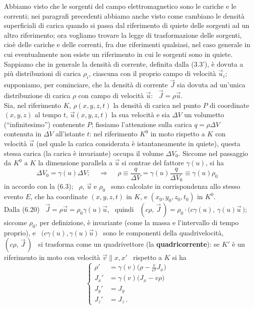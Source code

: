 Abbiamo visto che le sorgenti del campo elettromagnetico sono le cariche e le
correnti; nei paragrafi precedenti abbiamo anche visto come cambiano le
densit\`a superficiali di carica quando si passa dal riferimento di quiete delle
sorgenti ad un altro riferimento; ora vogliamo trovare la legge di
trasformazione delle sorgenti, cio\`e delle cariche e delle correnti, fra due
riferimenti qualsiasi, nel caso generale in cui eventualmente non esiste un
riferimento in cui le sorgenti sono in quiete.\\
Sappiamo che in generale la densit\`a di corrente, definita dalla (3.3'), \`e
dovuta a pi\`u distribuzioni di carica $\rho_i$, ciascuna con il proprio campo
di velocit\`a $\vec u_i$; supponiamo, per cominciare, che la densit\`a di
corrente $\vec J$ sia dovuta ad un'unica distribuzione di carica $\rho$ con
campo di velocit\`a $\vec u$: \ $\vec J=\rho\vec u$.\\
Sia, nel riferimento $K$, $\rho(x,y,z,t)$ la densit\`a di carica nel punto $P$
di coordinate $(x,y,z)$ al tempo $t$, $\vec u(x,y,z,t)$ la sua velocit\`a e sia
$\Delta V$ un volumetto (``infinitesimo'') contenente $P$; fissiamo l'attenzione
sulla carica $q=\rho\Delta V$ contenuta in $\Delta V$ all'istante $t$: nel
riferimento $K^0$ in moto rispetto a $K$ con velocit\`a $\vec u$ (nel quale la
carica considerata \`e istantaneamente in quiete), questa stessa carica (la
carica \`e invariante) occupa il volume $\Delta V_0$. Siccome nel passaggio da
$K^0$ a $K$ la dimensione parallela a $\vec u$ si contrae del fattore
$\gamma(u)$, si ha
\begin{equation}
  \Delta V_0=\gamma(u)\Delta V;
  \quad\ \Rightarrow\quad\ \rho\equiv\frac{q}{\Delta V}
  =\gamma(u)\frac{q}{\Delta V_0}\equiv\gamma(u)\rho_0
  \tag{6.20}
\end{equation}
in accordo con la (6.3); \ $\rho$, $\vec u$ e $\rho_0$ \ sono calcolate in
corrispondenza allo stesso evento $E$, che ha coordinate $(x,y,z,t)$ in $K$, e
$(x_0,y_0,z_0,t_0)$ in $K^0$.\\
Dalla (6.20) \ $\vec J=\rho\vec u=\rho_0\gamma(u)\vec u$, \ quindi
\ $(c\rho,\,\vec J\,)=\rho_0\cdot\big(c\gamma(u),\,\gamma(u)\vec u\,\big)$;
siccome $\rho_0$, per definizione, \`e invariante (come la massa e l'intervallo
di tempo proprio), e \ $\big(c\gamma(u),\gamma(u)\vec u\,\big)$ \ sono le
componenti della quadrivelocit\`a, \ $(c\rho,\,\vec J\,)$ \ si trasforma come un
quadrivettore (la \textbf{quadricorrente}): se $K'$ \`e un riferimento in moto
con velocit\`a $\vec v\parallel x,x'$ \ rispetto a $K$ si ha
\begin{equation}
  \left\{\begin{aligned}
    \rho'&=\gamma(v)\big(\rho-\frac{v}{c^2}J_x\big)\\
    J_x'&=\gamma(v)\big(J_x-v\rho\big)\\
    J_y'&=J_y\\
    J_z'&=J_z\,.
  \end{aligned}\right.
  \tag{6.21}
\end{equation}
